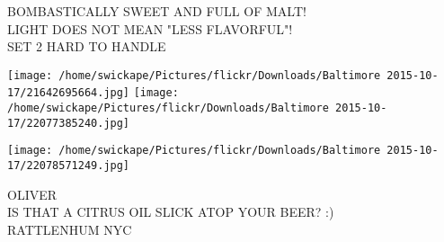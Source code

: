 \documentclass[10pt,letterpaper]{article}
\begin{document}
BOMBASTICALLY SWEET AND FULL OF MALT!\\
LIGHT DOES NOT MEAN "LESS FLAVORFUL"!\\
SET 2 HARD TO HANDLE
\pagebreak

\texttt{[image: /home/swickape/Pictures/flickr/Downloads/Baltimore 2015-10-17/21642695664.jpg]}
\texttt{[image: /home/swickape/Pictures/flickr/Downloads/Baltimore 2015-10-17/22077385240.jpg]}

\texttt{[image: /home/swickape/Pictures/flickr/Downloads/Baltimore 2015-10-17/22078571249.jpg]}

OLIVER\\
IS THAT A CITRUS OIL SLICK ATOP YOUR BEER? :)\\
RATTLENHUM NYC
\pagebreak
\end{document}
